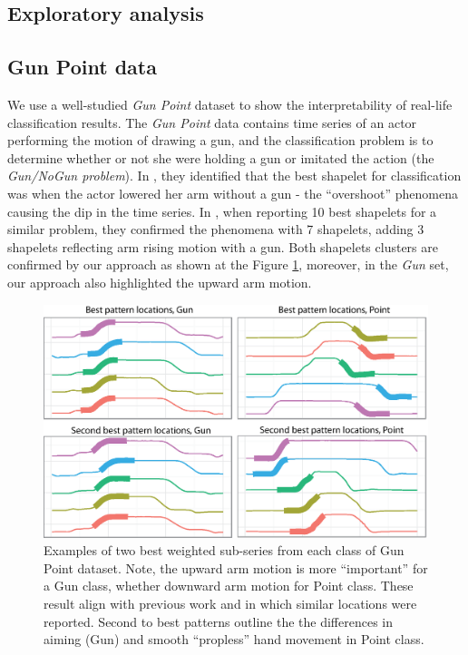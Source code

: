 \documentclass{llncs}
\begin{document}
\subsection{Exploratory analysis}

\subsection{Gun Point data}
We use a well-studied \textit{Gun Point} dataset to show the interpretability of real-life
classification results. The \textit{Gun Point} data contains time series of an actor performing the
motion of drawing a gun, and the classification problem is to determine whether or not she were
holding a gun or imitated the action (the \textit{Gun/NoGun problem}). In \cite{shapelet}, they
identified that the best shapelet for classification was when the actor lowered her arm without a
gun - the ``overshoot'' phenomena causing the dip in the time series. In \cite{bagnal}, when
reporting 10 best shapelets for a similar problem, they confirmed the phenomena with 7 shapelets,
adding 3 shapelets reflecting arm rising motion with a gun. Both shapelets clusters are confirmed by
our approach as shown at the Figure \ref{fig:shapelet-like-patterns}, moreover, in the \textit{Gun}
set, our approach also highlighted the upward arm motion.

\begin{figure}[tbp]
   \centering
   \includegraphics[width=150mm]{figures/shapelet-patterns.ps}
   \caption{Examples of two best weighted sub-series from each class of Gun Point dataset. 
   Note, the upward arm motion is more ``important'' for a Gun class, whether downward arm motion
for Point class. These result align with previous work \cite{shapelet} and \cite{bagnal} in which 
similar locations were reported. Second to best patterns outline the the differences in aiming
(Gun) and smooth ``propless'' hand movement in Point class.
   }
   \label{fig:shapelet-like-patterns}
\end{figure}
\end{document}
